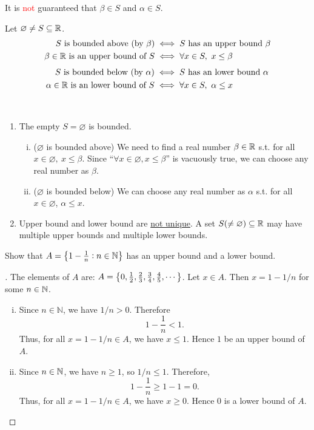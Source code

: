 \documentclass[11pt,openany]{article}
\begin{document}
\begin{remark*}[\textcolor{red}{\bf Caution!}]
	It is \textcolor{red}{not} guaranteed that $\beta\in S$ and $\alpha\in S$.
\end{remark*}
\vfill
\begin{remark*}
	Let $\varnothing\neq S\subseteq\mathbb{R}$.
	\begin{align*}
		S\ \text{is bounded above}\ (\text{by}\ \beta) &\iff S\ \text{has an upper bound}\ \beta\\
		\beta\in\R\ \text{is an upper bound of}\ S &\iff \forall x\in S,\ x\leq \beta
	\end{align*}
	\begin{align*}
		S\ \text{is bounded below}\ (\text{by}\ \alpha) &\iff S\ \text{has an lower bound}\ \alpha\\
		\alpha\in\R\ \text{is an lower bound of}\ S &\iff \forall x\in S,\ \alpha\leq x
	\end{align*}
\end{remark*}
\vfill
\begin{remark*}
\ \begin{enumerate}
	\item The empty $S=\varnothing$ is bounded.
	\begin{enumerate}[(i)]
		\item ($\varnothing$ is bounded above) We need to find a real number $\beta\in\mathbb{R}$ s.t. for all $x\in\varnothing,\ x\leq\beta$. Since ``$\forall x\in\varnothing, x\leq\beta$'' is vacuously true, we can choose any real number as $\beta$.
		\item ($\varnothing$ is bounded below) We can choose any real number as $\alpha$ s.t. for all $x\in\varnothing$, $\alpha\leq x$.
	\end{enumerate}
	\item Upper bound and lower bound are \underline{not unique}. A set \( S(\neq\varnothing)\subseteq\mathbb{R} \) may have multiple upper bounds and multiple lower bounds.
\end{enumerate}
\end{remark*}
\newpage
\begin{exercise*}
Show that $A=\set{1-\frac{1}{n}:n\in\mathbb{N}}$ has an upper bound and a lower bound.
\begin{proof}[\sol]
	The elements of $A$ are: $A=\set{0, \frac{1}{2}, \frac{2}{3}, \frac{3}{4}, \frac{4}{5}, \cdots}$. Let $x\in A$. Then $x=1-1/n$ for some $n\in\mathbb{N}$. \begin{enumerate}[(i)]
		\item Since $n\in\mathbb{N}$, we have $1/n>0$. Therefore \[
		1-\frac{1}{n}<1.
		\] Thus, for all $x=1-1/n\in A$, we have $x\leq 1$. Hence $1$ be an upper bound of $A$.
		\item Since $n\in\mathbb{N}$, we have $n\geq 1$, so $1/n\leq 1$. Therefore, \[
		1-\frac{1}{n}\geq 1-1=0.
		\] Thus, for all $x=1-1/n\in A$, we have $x\geq 0$. Hence $0$ is a lower bound of $A$.
	\end{enumerate}
	\begin{center}
	
	\end{center}
\end{proof}
\end{exercise*}
\end{document}

